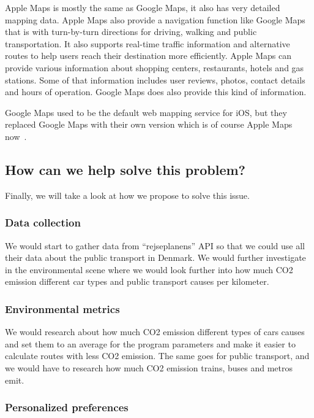 Apple Maps is mostly the same as Google Maps, it also has very detailed mapping data.
Apple Maps also provide a navigation function like Google Maps that is with turn-by-turn directions for driving, walking
and public transportation.
It also supports real-time traffic information and alternative routes to help users reach their destination more
efficiently.
Apple Maps can provide various information about shopping centers, restaurants, hotels and gas stations.
Some of that information includes user reviews, photos, contact details and hours of operation.
Google Maps does also provide this kind of information.

Google Maps used to be the default web mapping service for iOS, but they replaced Google Maps with their own version
which is of course Apple Maps now~\cite{applemaps2023}.

\subsection{How can we help solve this problem?}\label{subsec:how-can-we-help-solve-this-problem?}

Finally, we will take a look at how we propose to solve this issue.

\subsubsection{Data collection}

We would start to gather data from ``rejseplanens'' API so that we could use all their data about the public transport
in Denmark.
We would further investigate in the environmental scene where we would look further into how much CO2 emission different
car types and public transport causes per kilometer.

\subsubsection{Environmental metrics}

We would research about how much CO2 emission different types of cars causes and set them to an average for the program
parameters and make it easier to calculate routes with less CO2 emission.
The same goes for public transport, and we would have to research how much CO2 emission trains, buses and metros emit.

\subsubsection{Personalized preferences}

